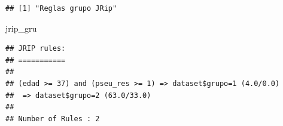 \documentclass[]{article}
\newenvironment{Shaded}{\begin{snugshade}}{\end{snugshade}}
\newcommand{\NormalTok}[1]{#1}
\begin{document}
\begin{verbatim}
## [1] "Reglas grupo JRip"
\end{verbatim}

\begin{Shaded}
\begin{Highlighting}[]
\NormalTok{jrip_gru}
\end{Highlighting}
\end{Shaded}

\begin{verbatim}
## JRIP rules:
## ===========
## 
## (edad >= 37) and (pseu_res >= 1) => dataset$grupo=1 (4.0/0.0)
##  => dataset$grupo=2 (63.0/33.0)
## 
## Number of Rules : 2
\end{verbatim}
\end{document}
